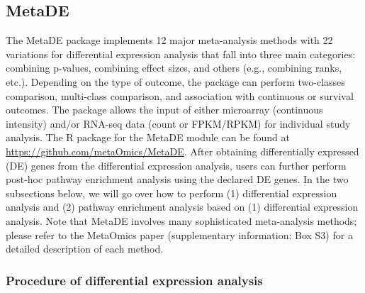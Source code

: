 \subsection{MetaDE}

The MetaDE package implements 12 major meta-analysis methods with 22 variations for differential expression analysis that fall into three main categories: combining p-values, combining effect sizes, 
and others (e.g., combining ranks, etc.). Depending on the type of outcome, the package can perform two-classes comparison, multi-class comparison, and association with continuous or survival outcomes. The package allows the input of either microarray (continuous intensity) and/or RNA-seq data (count or FPKM/RPKM) for individual study analysis. 
The R package for the MetaDE module can be found at \url{https://github.com/metaOmics/MetaDE}.
After obtaining differentially expressed (DE) genes from the differential expression analysis, 
users can further perform post-hoc pathway enrichment analysis using the declared DE genes.
In the two subsections below, 
we will go over how to perform (1) differential expression analysis and (2) pathway enrichment analysis based on (1) differential expression analysis.
Note that 
MetaDE involves many sophisticated meta-analysis methods; please refer to the MetaOmics paper (supplementary information: Box S3) for a detailed description of each method. 

\subsubsection{Procedure of differential expression analysis}

